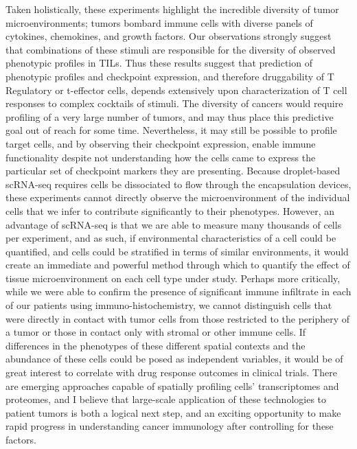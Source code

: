 Taken holistically, these experiments highlight the incredible diversity of tumor microenvironments; tumors bombard immune cells with diverse panels of cytokines, chemokines, and growth factors. 
Our observations strongly suggest that combinations of these stimuli are responsible for the diversity of observed phenotypic profiles in TILs. 
Thus these results suggest that prediction of phenotypic profiles and checkpoint expression, and therefore druggability of T Regulatory or t-effector cells, depends extensively upon characterization of T cell responses to complex cocktails of stimuli. 
The diversity of cancers would require profiling of a very large number of tumors, and may thus place this predictive goal out of reach for some time. 
Nevertheless, it may still be possible to profile target cells, and by observing their checkpoint expression, enable immune functionality despite not understanding how the cells came to express the particular set of checkpoint markers they are presenting.
Because droplet-based scRNA-seq requires cells be dissociated to flow through the encapsulation devices, these experiments cannot directly observe the microenvironment of the individual cells that we infer to contribute significantly to their phenotypes. 
However, an advantage of scRNA-seq is that we are able to measure many thousands of cells per experiment, and as such, if environmental characteristics of a cell could be quantified, and cells could be stratified in terms of similar environments, it would create an immediate and powerful method through which to quantify the effect of tissue microenvironment on each cell type under study. 
Perhaps more critically, while we were able to confirm the presence of significant immune infiltrate in each of our patients using immuno-histochemistry, we cannot distinguish cells that were directly in contact with tumor cells from those restricted to the periphery of a tumor or those in contact only with stromal or other immune cells. 
If differences in the phenotypes of these different spatial contexts and the abundance of these cells could be posed as independent variables, it would be of great interest to correlate with drug response outcomes in clinical trials.  
There are emerging approaches capable of spatially profiling cells' transcriptomes and proteomes, and I believe that large-scale application of these technologies to patient tumors is both a logical next step, and an exciting opportunity to make rapid progress in understanding cancer immunology after controlling for these factors. 

